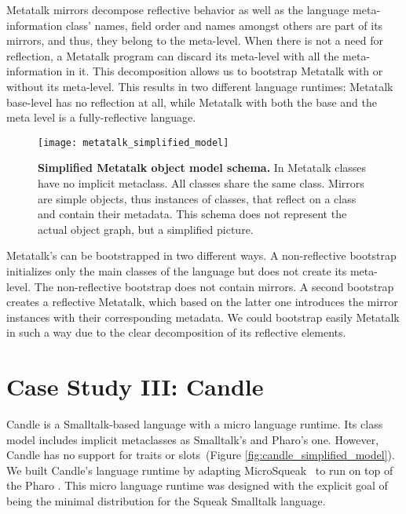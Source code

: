 Metatalk mirrors decompose reflective behavior as well as the language meta-information \ie class' names, field order and names amongst others are part of its mirrors, and thus, they belong to the meta-level. When there is not a need for reflection, a Metatalk program can discard its meta-level with all the meta-information in it. This decomposition allows us to bootstrap Metatalk with or without its meta-level. This results in two different language runtimes: Metatalk base-level has no reflection at all, while Metatalk with both the base and the meta level is a fully-reflective language.

\begin{figure}[ht]
\center
\texttt{[image: metatalk\_simplified\_model]}
\caption{\textbf{Simplified Metatalk object model schema.} In Metatalk classes have no implicit metaclass. All classes share the same class. Mirrors are simple objects, thus instances of classes, that reflect on a class and contain their metadata. This schema does not represent the actual object graph, but a simplified picture.\label{fig:metatalk_simplified_model}}
\end{figure}

Metatalk's can be bootstrapped in two different ways. A non-reflective bootstrap initializes only the main classes of the language but does not create its meta-level. The non-reflective bootstrap does not contain mirrors. A second bootstrap creates a reflective Metatalk, which based on the latter one introduces the mirror instances with their corresponding metadata. We could bootstrap easily Metatalk in such a way due to the clear decomposition of its reflective elements. 

\section{Case Study III: Candle} \label{sec:bootstrap_candle}

Candle is a Smalltalk-based language with a micro language runtime. Its class model includes implicit metaclasses as Smalltalk's and Pharo's one. However, Candle has no support for traits or slots~(Figure \ref{fig:candle_simplified_model}). We built Candle's language runtime by adapting MicroSqueak~\cite{Malo11a} to run on top of the Pharo \VM. This micro language runtime was designed with the explicit goal of being the minimal distribution for the Squeak Smalltalk language.

